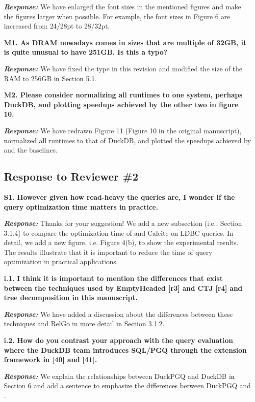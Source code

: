 \textbf{\textit{Response: }}
We have enlarged the font sizes in the mentioned figures and make the figures larger when possible.
For example, the font sizes in Figure 6 are increased from 24/28pt to 28/32pt.


\textbf{M1. As DRAM nowadays comes in sizes that are multiple of 32GB, it is quite unusual to have 251GB. Is this a typo?}

\textbf{\textit{Response: }}
We have fixed the type in this revision and modified the size of the RAM to 256GB in Section 5.1.

\textbf{M2. Please consider normalizing all runtimes to one system, perhaps DuckDB, and plotting speedups achieved by the other two in figure 10.}

\textbf{\textit{Response: }}
We have redrawn Figure 11 (Figure 10 in the original manuscript), normalized all runtimes to that of DuckDB, and plotted the speedups achieved by \name and the baselines.


\subsection{Response to Reviewer \#2}

\textbf{S1. However given how read-heavy the queries are, I wonder if the query optimization time matters in practice.}

\textbf{\textit{Response: }}
Thanks for your suggestion! We add a new subsection (i.e., Section 3.1.4) to compare the optimization time of \name and Calcite on LDBC queries.
In detail, we add a new figure, i.e. Figure 4(b), to show the experimental results.
The results illustrate that it is important to reduce the time of query optimization in practical applications. 



\textbf{
i.1. I think it is important to mention the differences that exist between the techniques used by EmptyHeaded [r3] and CTJ [r4]  and tree decomposition in this manuscript.}

\textbf{\textit{Response: }}
We have added a discussion about the differences between these techniques and RelGo in more detail in Section 3.1.2.


\textbf{i.2. How do you contrast your approach with the query evaluation where the DuckDB team introduces SQL/PGQ through the extension framework in [40] and [41].}

\textbf{\textit{Response: }}
We explain the relationships between DuckPGQ and DuckDB in Section 6 and add a sentence to emphasize the differences between DuckPGQ and \name.


